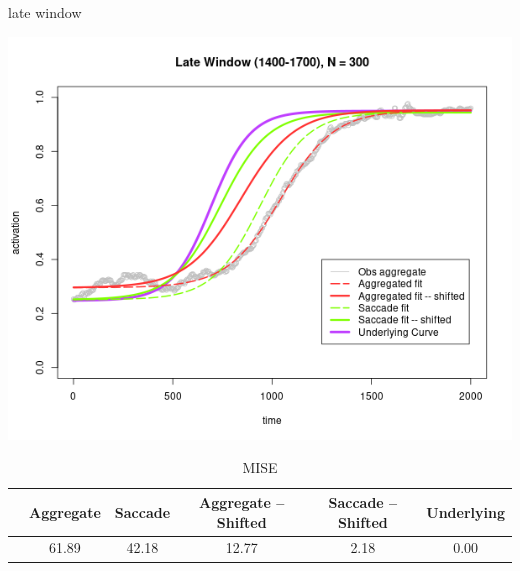 \documentclass{beamer}
\begin{document}
\begin{frame}{late window}
\begin{center}
\includegraphics[scale=0.35]{img/late_fit.png}
\end{center}
{\scriptsize
\begin{table}[ht]
\captionsetup{font=scriptsize}
\caption*{MISE}
\centering
\begin{tabular}{cccccc}
  \hline
 & Aggregate & Saccade & Aggregate -- Shifted & Saccade -- Shifted & Underlying \\ 
  \hline
 & 61.89 & 42.18 & 12.77 & 2.18 & 0.00 \\ 
   \hline
\end{tabular}
\end{table}
}
\end{frame}
\end{document}
